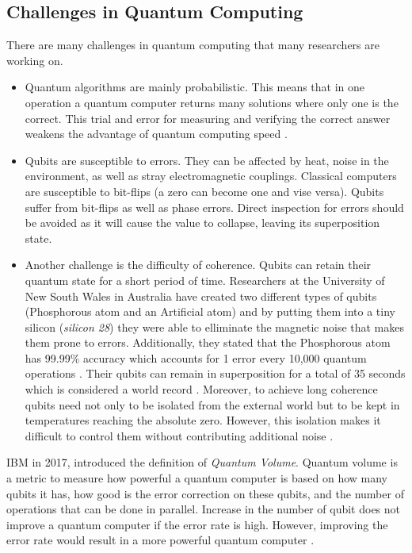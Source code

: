 \documentclass[conference, letterpaper]{IEEEtran}
\begin{document}
\subsection{Challenges in Quantum Computing}
There are many challenges in quantum computing that many researchers are working on.
\begin{itemize} 
\item Quantum algorithms are mainly probabilistic. This means that in one operation a quantum computer returns many solutions where only one is the correct. This trial and error for measuring and verifying the correct answer weakens the advantage of quantum computing speed \cite{Kirsch2015}.

\item Qubits are susceptible to errors. They can be affected by heat, noise in the environment, as well as stray electromagnetic couplings. Classical computers are susceptible to bit-flips (a zero can become one and vise versa). Qubits suffer from bit-flips as well as phase errors. Direct inspection for errors should be avoided as it will cause the value to collapse, leaving its superposition state. 

\item Another challenge is the difficulty of coherence. Qubits can retain their quantum state for a short period of time. Researchers at the University of New South Wales in Australia have created two different types of qubits (Phosphorous atom and an Artificial atom) and by putting them into a tiny silicon (\textit{silicon 28}) they were able to elliminate the magnetic noise that makes them prone to errors. Additionally, they stated that the Phosphorous atom has 99.99\% accuracy which accounts for 1 error every 10,000 quantum operations \cite{Muhonen2014}. Their qubits can remain in superposition for a total of 35 seconds which is considered a world record \cite{D-Wave2016}. Moreover, to achieve long coherence qubits need not only to be isolated from the external world but to be kept in temperatures reaching the absolute zero. However, this isolation makes it difficult to control them without contributing additional noise \cite{Kirsch2015}.
\end{itemize}
IBM in 2017, introduced the definition of \textit{Quantum Volume}. Quantum volume is a metric to measure how powerful a quantum computer is based on how many qubits it has, how good is the error correction on these qubits, and the number of operations that can be done in parallel. Increase in the number of qubit does not improve a quantum computer if the error rate is high. However, improving the error rate would result in a more powerful quantum computer \cite{Quantum_volume}.
\end{document}
